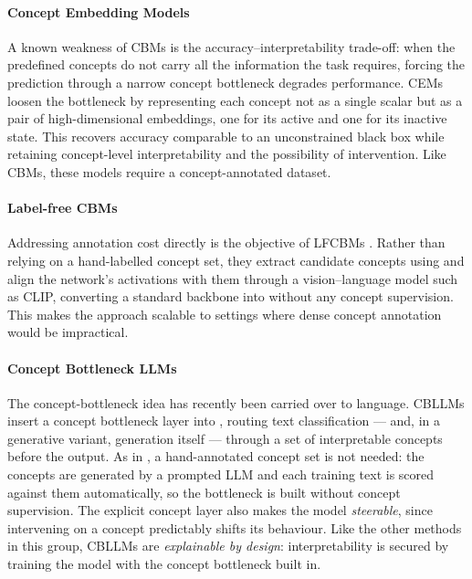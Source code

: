     \paragraph{Concept Embedding Models} A known weakness of \acp{CBM} is the
    accuracy--interpretability trade-off: when the predefined concepts do not
    carry all the information the task requires, forcing the prediction through
    a narrow concept bottleneck degrades performance. \Acp{CEM}
    \citep{espinosazarlengaConceptEmbeddingModels2022} loosen the bottleneck by
    representing each concept not as a single scalar but as a pair of
    high-dimensional embeddings, one for its active and one for its inactive
    state. This recovers accuracy comparable to an unconstrained black box while
    retaining concept-level interpretability and the possibility of
    intervention. Like \acp{CBM}, these models require a concept-annotated
    dataset.

    \paragraph{Label-free CBMs} Addressing annotation cost directly is the
    objective of \acp{LFCBM} \citep{oikarinenLabelfreeConceptBottleneck2022}.
    Rather than relying on a hand-labelled concept set, they extract candidate
    concepts using  and align the network's activations with them
    through a vision--language model such as \acs{CLIP}, converting a standard
    backbone into  without any concept supervision. This makes the
    approach scalable to settings where dense concept annotation would be
    impractical.

    \paragraph{Concept Bottleneck LLMs} The concept-bottleneck idea has recently
    been carried over to language. \Acp{CBLLM}
    \citep{sunConceptBottleneckLarge2025a} insert a concept bottleneck layer
    into , routing text classification --- and, in a generative
    variant, generation itself --- through a set of interpretable concepts
    before the output. As in , a hand-annotated concept set is not
    needed: the concepts are generated by a prompted \ac{LLM} and each training
    text is scored against them automatically, so the bottleneck is built
    without concept supervision. The explicit concept layer also makes the model
    \textit{steerable}, since intervening on a concept predictably shifts its
    behaviour. Like the other methods in this group, \acp{CBLLM} are
    \textit{explainable by design}: interpretability is secured by training the
    model with the concept bottleneck built in.

